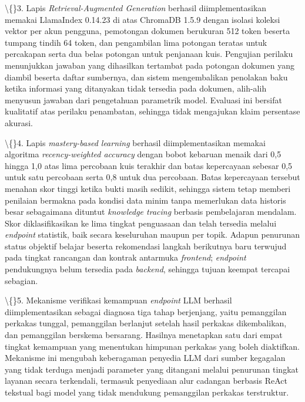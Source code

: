 \documentclass[12pt,a4paper]{article}
\begin{document}
\textbackslash\{\}3. Lapis \textit{Retrieval-Augmented Generation} berhasil diimplementasikan memakai LlamaIndex 0.14.23 di atas ChromaDB 1.5.9 dengan isolasi koleksi vektor per akun pengguna, pemotongan dokumen berukuran 512 token beserta tumpang tindih 64 token, dan pengambilan lima potongan teratas untuk percakapan serta dua belas potongan untuk penjanaan kuis. Pengujian perilaku menunjukkan jawaban yang dihasilkan tertambat pada potongan dokumen yang diambil beserta daftar sumbernya, dan sistem mengembalikan penolakan baku ketika informasi yang ditanyakan tidak tersedia pada dokumen, alih-alih menyusun jawaban dari pengetahuan parametrik model. Evaluasi ini bersifat kualitatif atas perilaku penambatan, sehingga tidak mengajukan klaim persentase akurasi.



\textbackslash\{\}4. Lapis \textit{mastery-based learning} berhasil diimplementasikan memakai algoritma \textit{recency-weighted accuracy} dengan bobot kebaruan menaik dari 0,5 hingga 1,0 atas lima percobaan kuis terakhir dan batas kepercayaan sebesar 0,5 untuk satu percobaan serta 0,8 untuk dua percobaan. Batas kepercayaan tersebut menahan skor tinggi ketika bukti masih sedikit, sehingga sistem tetap memberi penilaian bermakna pada kondisi data minim tanpa memerlukan data historis besar sebagaimana dituntut \textit{knowledge tracing} berbasis pembelajaran mendalam. Skor diklasifikasikan ke lima tingkat penguasaan dan telah tersedia melalui \textit{endpoint} statistik, baik secara keseluruhan maupun per topik. Adapun penurunan status objektif belajar beserta rekomendasi langkah berikutnya baru terwujud pada tingkat rancangan dan kontrak antarmuka \textit{frontend}; \textit{endpoint} pendukungnya belum tersedia pada \textit{backend}, sehingga tujuan keempat tercapai sebagian.



\textbackslash\{\}5. Mekanisme verifikasi kemampuan \textit{endpoint} LLM berhasil diimplementasikan sebagai diagnosa tiga tahap berjenjang, yaitu pemanggilan perkakas tunggal, pemanggilan berlanjut setelah hasil perkakas dikembalikan, dan pemanggilan berskema bersarang. Hasilnya menetapkan satu dari empat tingkat kemampuan yang menentukan himpunan perkakas yang boleh diaktifkan. Mekanisme ini mengubah keberagaman penyedia LLM dari sumber kegagalan yang tidak terduga menjadi parameter yang ditangani melalui penurunan tingkat layanan secara terkendali, termasuk penyediaan alur cadangan berbasis ReAct tekstual bagi model yang tidak mendukung pemanggilan perkakas terstruktur.
\end{document}
